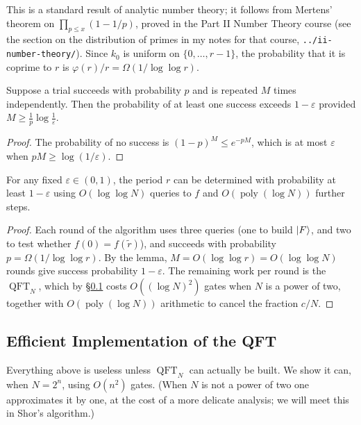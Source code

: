 \documentclass[a4paper]{scrartcl}
\newcommand{\QFT}{\operatorname{QFT}}
\DeclareMathOperator{\poly}{poly}
\begin{document}
This is a standard result of analytic number theory; it follows from Mertens' theorem on $\prod_{p\le x}(1-1/p)$, proved in the Part II Number Theory course (see the section on the distribution of primes in my notes for that course, \texttt{../ii-number-theory/}). Since $k_0$ is uniform on $\{0,\dots,r-1\}$, the probability that it is coprime to $r$ is $\varphi(r)/r = \Omega(1/\log\log r)$.

\begin{lemma}
	Suppose a trial succeeds with probability $p$ and is repeated $M$ times independently. Then the probability of at least one success exceeds $1-\varepsilon$ provided $M\geq \frac{1}{p}\log\frac1\varepsilon$.
\end{lemma}

\begin{proof}
	The probability of no success is $(1-p)^M\leq e^{-pM}$, which is at most $\varepsilon$ when $pM\geq\log(1/\varepsilon)$.
\end{proof}

\begin{corollary}
	For any fixed $\varepsilon\in(0,1)$, the period $r$ can be determined with probability at least $1-\varepsilon$ using $O(\log\log N)$ queries to $f$ and $O(\poly(\log N))$ further steps.
\end{corollary}

\begin{proof}
	Each round of the algorithm uses three queries (one to build $\ket F$, and two to test whether $f(0) = f(\widetilde r)$), and succeeds with probability $p = \Omega(1/\log\log r)$. By the lemma, $M = O(\log\log r) = O(\log\log N)$ rounds give success probability $1-\varepsilon$. The remaining work per round is the $\QFT_N$, which by \S\ref{sec:qftimpl} costs $O((\log N)^2)$ gates when $N$ is a power of two, together with $O(\poly(\log N))$ arithmetic to cancel the fraction $c/N$.
\end{proof}

\subsection{Efficient Implementation of the QFT}\label{sec:qftimpl}

Everything above is useless unless $\QFT_N$ can actually be built. We show it can, when $N = 2^n$, using $O(n^2)$ gates. (When $N$ is not a power of two one approximates it by one, at the cost of a more delicate analysis; we will meet this in Shor's algorithm.)
\end{document}
